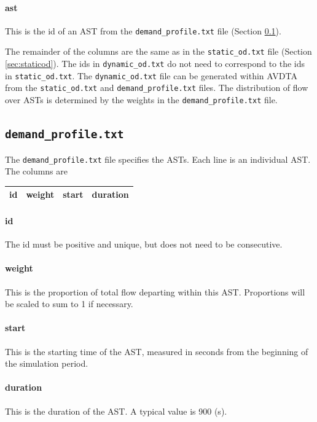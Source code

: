 \paragraph*{ast} This is the id of an AST from the \texttt{demand\_profile.txt} file (Section \ref{sec:demandprofile}).

The remainder of the columns are the same as in the \texttt{static\_od.txt} file (Section \ref{sec:staticod}). The ids in \texttt{dynamic\_od.txt} do not need to correspond to the ids in \texttt{static\_od.txt}. The \texttt{dynamic\_od.txt} file can be generated within AVDTA from the \texttt{static\_od.txt} and \texttt{demand\_profile.txt} files. The distribution of flow over ASTs is determined by the weights in the \texttt{demand\_profile.txt} file.

\subsection{\texttt{demand\_profile.txt}}
\label{sec:demandprofile}

The \texttt{demand\_profile.txt} file specifies the ASTs. Each line is an individual AST. The columns are
\begin{center}
\begin{tabular}{cccc}
\hline
id & weight & start & duration \\\hline
\end{tabular}
\end{center}
\paragraph*{id} The id must be positive and unique, but does not need to be consecutive.
\paragraph*{weight} This is the proportion of total flow departing within this AST. Proportions will be scaled to sum to 1 if necessary.
\paragraph*{start} This is the starting time of the AST, measured in seconds from the beginning of the simulation period.
\paragraph*{duration} This is the duration of the AST. A typical value is 900 (s).


